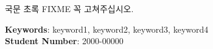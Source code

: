 \documentclass[doctor]{snuee}
\begin{document}
	
	
	
	
	
	


%
\begin{summary}
	\par    %
	국문 초록 FIXME 꼭 고쳐주십시오. 
	\vfill
\begin{minipage}[t][20mm][b]{\textwidth}
	{\bfseries Keywords}: keyword1, keyword2, keyword3, keyword4 \\ %
	{\bfseries Student Number}: 2000-00000\\                        %
\end{minipage}
\end{summary}
\changepage {15mm}{}{}{}{}{-30mm}{}{}{15mm} %


\end{document}
